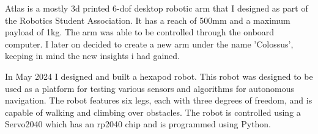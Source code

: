 \documentclass[10pt, a4paper, withhyper]{altacv}
\begin{document}
\begin{paracol}
    \divider



     Atlas
    is a mostly 3d printed 6-dof desktop robotic arm that I designed as part of
    the Robotics Student Association. It has a reach of 500mm and a maximum payload
    of 1kg. The arm was able to be controlled through the onboard computer. I later
    on decided to create a new arm under the name 'Colossus', keeping in mind
    the new insights i had gained.

    \divider

     In May 2024
    I designed and built a hexapod robot. This robot was designed to be used as
    a platform for testing various sensors and algorithms for autonomous
    navigation. The robot features six legs, each with three degrees of freedom,
    and is capable of walking and climbing over obstacles. The robot is
    controlled using a Servo2040 which has an rp2040 chip and is programmed
    using Python.







\end{paracol}
\end{document}
